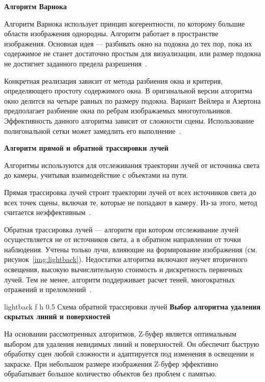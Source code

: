 \fi

\textbf{Алгоритм Варнока}

Алгоритм Варнока использует принцип когерентности, по которому большие области изображения однородны.
Алгоритм работает в пространстве изображения.
Основная идея --- разбивать окно на подокна до тех пор, пока их содержимое не станет достаточно простым для визуализации, или размер подокна не достигнет заданного предела разрешения~\cite{del_line, varnok}.

Конкретная реализация зависит от метода разбиения окна и критерия, определяющего простоту содержимого окна.
В оригинальной версии алгоритма окно делится на четыре равных по размеру подокна.
Вариант Вейлера и Азертона предполагает разбиение окна по ребрам изображаемых многоугольников. Эффективность данного алгоритма зависит от сложности сцены. Использование полигональной сетки может замедлить его выполнение~\cite{varnok}.


\textbf{Алгоритм прямой и обратной трассировки лучей} 

Алгоритмы используются для отслеживания траектории лучей от источника света до камеры, учитывая взаимодействие с объектами на пути. 

Прямая трассировка лучей строит траектории лучей от всех источников света до всех точек сцены, включая те, которые не попадают в камеру. Из-за этого, метод считается неэффективным~\cite{ray_tracing}.

Обратная трассировка лучей --- алгоритм при котором отслеживание лучей осуществляется не от источников света, а в обратном направлении от точки наблюдения. 
Учтены только лучи, влияющие на формирование изображения (см. рисунок~\ref{img:lightback}).
Недостатки алгоритма включают неучет вторичного освещения, высокую вычислительную стоимость и дискретность первичных лучей.
Тем не менее, алгоритм поддерживает расчет теней, многократных отражений и преломлений~\cite{ray_tracing}.

	{lightback} %
	{f} %
	{h} %
	{0.5\textwidth} %
	{Схема обратной трассировки лучей} %
\textbf{Выбор алгоритма удаления скрытых линий и поверхностей}

На основании рассмотренных алгоритмов, Z-буфер является оптимальным выбором для удаления невидимых линий и поверхностей. Он обеспечит быструю обработку сцен любой сложности и адаптируется под изменения в освещении и закраске. При небольшом размере изображения Z-буфер эффективно обрабатывает большое количество объектов без проблем с памятью. 

